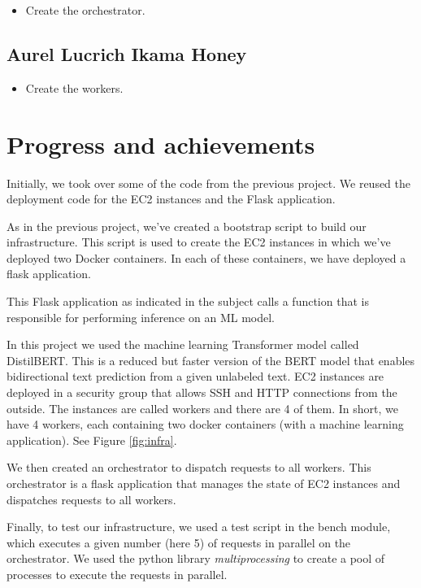 \documentclass[letterpaper,headings=standardclasses,parskip=half]{scrartcl}
\begin{document}
\begin{itemize}
    \item Create the orchestrator.
\end{itemize}

\subsection*{Aurel Lucrich Ikama Honey}

\begin{itemize}
    \item Create the workers.
\end{itemize}

\section{Progress and achievements}

Initially, we took over some of the code from the previous project. We reused the deployment code for the EC2 instances and the Flask application.

As in the previous project, we've created a bootstrap script to build our infrastructure. This script is used to create the EC2 instances in which we've deployed two Docker containers. In each of these containers, we have deployed a flask application.

This Flask application as indicated in the subject calls a function that is responsible for performing inference on an ML model.

In this project we used the machine learning Transformer model called
DistilBERT. This is a reduced but faster version of the BERT model that enables
bidirectional text prediction from a given unlabeled text. EC2 instances are
deployed in a security group that allows SSH and HTTP connections from the
outside. The instances are called workers and there are 4 of them. In short, we
have 4 workers, each containing two docker containers (with a machine learning application). See Figure \ref{fig:infra}.

We then created an orchestrator to dispatch requests to all workers. This orchestrator is a flask application that manages the state of EC2 instances and dispatches requests to all workers.

Finally, to test our infrastructure, we used a test script in the bench module, which executes a given number (here 5) of requests in parallel on the orchestrator. We used the python library \emph{multiprocessing} to create a pool of processes to execute the requests in parallel.
\end{document}

